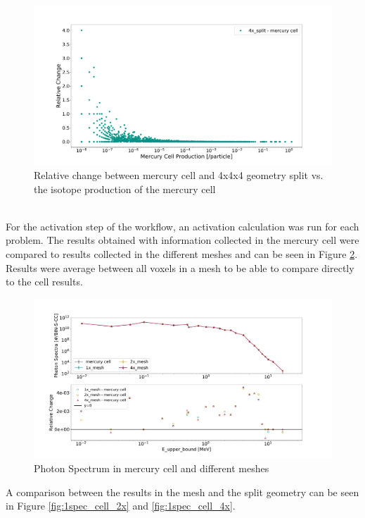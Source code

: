 \begin{figure}[h!]
 \centering
 \includegraphics[scale=0.42,trim={3cm 0.5cm 3cm 3cm},clip]{../figs/toy_p1/prod_VPI_rc_4x_split.pdf}
 \caption{Relative change between mercury cell and 4x4x4 geometry split vs. the isotope production of the mercury cell}
 \label{fig:1prod_cell_4x_rc}
\end{figure}
%
\\
For the activation step of the workflow, an activation calculation was run for
each problem. The results obtained with information collected in the mercury
cell were compared to results collected in the different meshes and can be seen
in Figure \ref{fig:1spec_cell_1x_2x_4x}. Results were average between all voxels
in a mesh to be able to compare directly to the cell results.
%
\begin{figure}[h!]
 \centering
 \includegraphics[scale=0.42,trim={2cm 0.5cm 3cm 2cm},clip]{../figs/toy_p1/spec_VPI_1x_2x_4x.pdf}
 \caption{Photon Spectrum in mercury cell and different meshes}
 \label{fig:1spec_cell_1x_2x_4x}
\end{figure}
%
A comparison between the results in the mesh and the split geometry can be seen
in Figure \ref{fig:1spec_cell_2x} and \ref{fig:1spec_cell_4x}.
